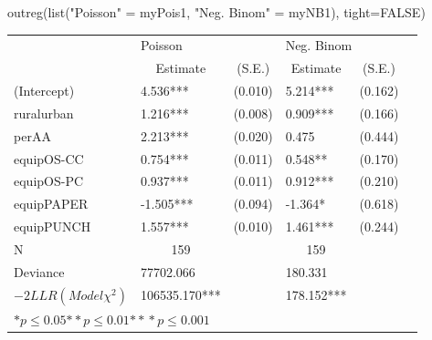 \begin{Schunk}
\begin{Sinput}
 outreg(list("Poisson" = myPois1, "Neg. Binom" = myNB1), tight=FALSE)
\end{Sinput}
\begin{tabular}{@{}l*{5}{l}@{}}
\hline
   & \multicolumn{2}{l}{Poisson}& \multicolumn{2}{l}{Neg. Binom}\tabularnewline
   & \multicolumn{1}{c}{Estimate}& \multicolumn{1}{c}{(S.E.)}& \multicolumn{1}{c}{Estimate}& \multicolumn{1}{c}{(S.E.)}\tabularnewline
 \hline
 \hline
  (Intercept)    &4.536*** &   (0.010) &5.214*** &   (0.162) \tabularnewline
  ruralurban    &1.216*** &   (0.008) &0.909*** &   (0.166) \tabularnewline
  perAA    &2.213*** &   (0.020) &0.475 &   (0.444) \tabularnewline
  equipOS-CC    &0.754*** &   (0.011) &0.548** &   (0.170) \tabularnewline
  equipOS-PC    &0.937*** &   (0.011) &0.912*** &   (0.210) \tabularnewline
  equipPAPER    &-1.505*** &   (0.094) &-1.364* &   (0.618) \tabularnewline
  equipPUNCH    &1.557*** &   (0.010) &1.461*** &   (0.244) \tabularnewline
 \hline
 N& \multicolumn{1}{c}{159} && \multicolumn{1}{c}{159} & \tabularnewline
    Deviance        &77702.066         &&180.331         & \tabularnewline
 $-2LLR (Model \chi^2)$  &   106535.170*** &   &   178.152*** &   \tabularnewline
 \hline
\hline
 
 \multicolumn{5}{l}{${*  p}\le 0.05$${*\!\!*  p}\le 0.01$${*\!\!*\!\!*  p}\le 0.001$}\tabularnewline
 \end{tabular}\end{Schunk}
